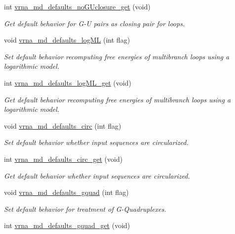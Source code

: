 \begin{DoxyCompactItemize}
int \hyperlink{group__model__details_ga4f7fdad083243a5348d63320ddaa70f3}{vrna\+\_\+md\+\_\+defaults\+\_\+no\+G\+Uclosure\+\_\+get} (void)
\begin{DoxyCompactList}\small\item\em Get default behavior for G-\/\+U pairs as closing pair for loops. \end{DoxyCompactList}\item 
void \hyperlink{group__model__details_ga3de50a73455d88c3957386933b8e1f90}{vrna\+\_\+md\+\_\+defaults\+\_\+log\+M\+L} (int flag)
\begin{DoxyCompactList}\small\item\em Set default behavior recomputing free energies of multibranch loops using a logarithmic model. \end{DoxyCompactList}\item 
int \hyperlink{group__model__details_ga93f04e070d529c5d0bb87c9681f6ad29}{vrna\+\_\+md\+\_\+defaults\+\_\+log\+M\+L\+\_\+get} (void)
\begin{DoxyCompactList}\small\item\em Get default behavior recomputing free energies of multibranch loops using a logarithmic model. \end{DoxyCompactList}\item 
void \hyperlink{group__model__details_ga4e1deb3e91a8a99e5c6dd905a5eb0186}{vrna\+\_\+md\+\_\+defaults\+\_\+circ} (int flag)
\begin{DoxyCompactList}\small\item\em Set default behavior whether input sequences are circularized. \end{DoxyCompactList}\item 
int \hyperlink{group__model__details_gad3a7e58de344ad93a08925f58f94f6fb}{vrna\+\_\+md\+\_\+defaults\+\_\+circ\+\_\+get} (void)
\begin{DoxyCompactList}\small\item\em Get default behavior whether input sequences are circularized. \end{DoxyCompactList}\item 
void \hyperlink{group__model__details_ga0685ca2aeb39af76f2421fc308163dce}{vrna\+\_\+md\+\_\+defaults\+\_\+gquad} (int flag)
\begin{DoxyCompactList}\small\item\em Set default behavior for treatment of G-\/\+Quadruplexes. \end{DoxyCompactList}\item 
int \hyperlink{group__model__details_gae645b8612f879eb38b45244fa9eddb9e}{vrna\+\_\+md\+\_\+defaults\+\_\+gquad\+\_\+get} (void)

\end{DoxyCompactItemize}
